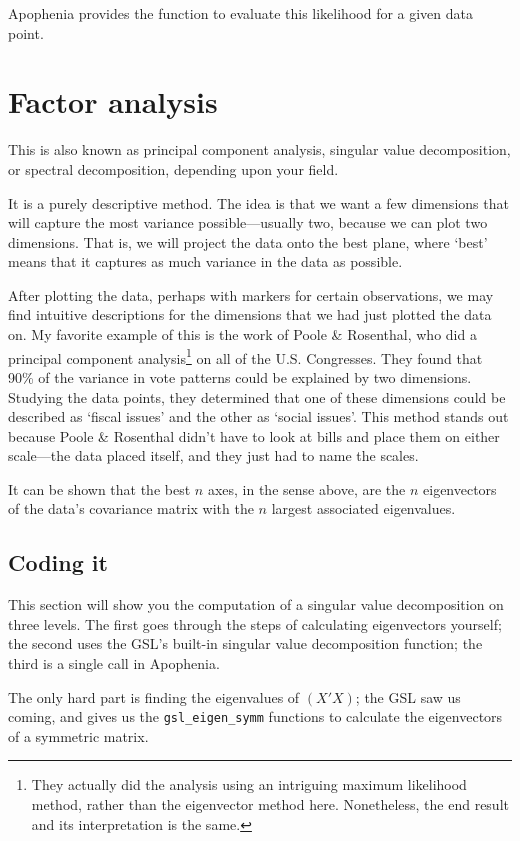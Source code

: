 Apophenia provides the function  to evaluate this likelihood for a given data point.



\section{Factor analysis} \label{pca} 
This is also known as principal component
analysis, singular value decomposition, or spectral decomposition, depending upon your field. 

It is a purely descriptive method.  The idea is that we want a few
dimensions that will capture the most variance possible---usually two,
because we can plot two dimensions. That is, we will project the data
onto the best plane, where `best' means that it captures as much
variance in the data as possible.

After plotting the data, perhaps with markers for certain observations,
we may find intuitive descriptions for the dimensions that we had just plotted the
data on. My favorite example of this is the work of Poole \& Rosenthal,
who did a principal component analysis\footnote{They actually did
the analysis using an intriguing maximum likelihood method, rather
than the eigenvector method here. Nonetheless, the end result and its
interpretation is the same.} on all of the U.S. Congresses. They found
that 90\% of the variance in vote patterns could be explained by two dimensions.
Studying the data points, they determined that one of these dimensions could be
described as `fiscal issues' and the other as `social issues'. This method stands
out because Poole \& Rosenthal didn't have to look at bills and place them on
either scale---the data placed itself, and they just had to name the scales.


It can be shown that the best $n$ axes, in the sense above, are the
$n$ eigenvectors of the data's covariance matrix with the $n$ largest
associated eigenvalues.

\subsection{Coding it}
This section will show you the computation of a singular value
decomposition on three levels. The first goes through the steps of
calculating eigenvectors yourself; the second uses the 
GSL's built-in singular value decomposition function; the third is a
single call in Apophenia.

The only hard part is finding the eigenvalues of
$(X'X)$; the GSL saw us coming, and gives us the {\tt gsl\_eigen\_symm} functions
to calculate the eigenvectors of a symmetric matrix.

